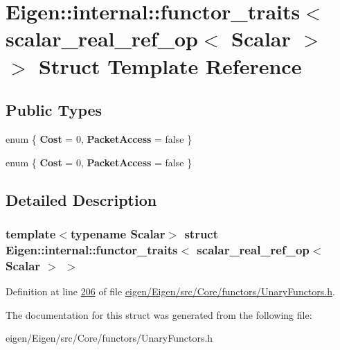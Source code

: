 \hypertarget{struct_eigen_1_1internal_1_1functor__traits_3_01scalar__real__ref__op_3_01_scalar_01_4_01_4}{}\section{Eigen\+:\+:internal\+:\+:functor\+\_\+traits$<$ scalar\+\_\+real\+\_\+ref\+\_\+op$<$ Scalar $>$ $>$ Struct Template Reference}
\label{struct_eigen_1_1internal_1_1functor__traits_3_01scalar__real__ref__op_3_01_scalar_01_4_01_4}
\subsection*{Public Types}
\begin{DoxyCompactItemize}
\item 
\mbox{\label{struct_eigen_1_1internal_1_1functor__traits_3_01scalar__real__ref__op_3_01_scalar_01_4_01_4_a7aced8cc090b421dd436f48b880b6e12}} 
enum \{ {\bfseries Cost} = 0, 
{\bfseries Packet\+Access} = false
 \}
\item 
\mbox{\label{struct_eigen_1_1internal_1_1functor__traits_3_01scalar__real__ref__op_3_01_scalar_01_4_01_4_ab48e52524feb795006060ca7bea70b69}} 
enum \{ {\bfseries Cost} = 0, 
{\bfseries Packet\+Access} = false
 \}
\end{DoxyCompactItemize}


\subsection{Detailed Description}
\subsubsection*{template$<$typename Scalar$>$\newline
struct Eigen\+::internal\+::functor\+\_\+traits$<$ scalar\+\_\+real\+\_\+ref\+\_\+op$<$ Scalar $>$ $>$}



Definition at line \hyperlink{eigen_2_eigen_2src_2_core_2functors_2_unary_functors_8h_source_l00206}{206} of file \hyperlink{eigen_2_eigen_2src_2_core_2functors_2_unary_functors_8h_source}{eigen/\+Eigen/src/\+Core/functors/\+Unary\+Functors.\+h}.



The documentation for this struct was generated from the following file\+:\begin{DoxyCompactItemize}
\item 
eigen/\+Eigen/src/\+Core/functors/\+Unary\+Functors.\+h\end{DoxyCompactItemize}
